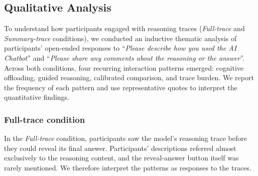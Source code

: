 \documentclass[acmlarge,review=true, anonymous=true]{acmart}
\begin{document}
\subsection{Qualitative Analysis}



To understand how participants engaged with reasoning traces (\textit{Full-trace} and \textit{Summary-trace} conditions), we conducted an inductive thematic analysis \cite{clarke2017thematic} of participants' open-ended responses to ``\textit{Please describe how you used the AI Chatbot}'' and ``\textit{Please share any comments about the reasoning or the answer}''. Across both conditions, four recurring interaction patterns emerged: cognitive offloading, guided reasoning, calibrated comparison, and trace burden. We report the frequency of each pattern and use representative quotes to interpret the quantitative findings. 



\subsubsection{Full-trace condition}

In the \textit{Full-trace} condition, participants saw the model's reasoning trace before they could reveal its final answer. Participants' descriptions referred almost exclusively to the reasoning content, and the reveal-answer button itself was rarely mentioned. We therefore interpret the patterns as responses to the traces. 

\end{document}
